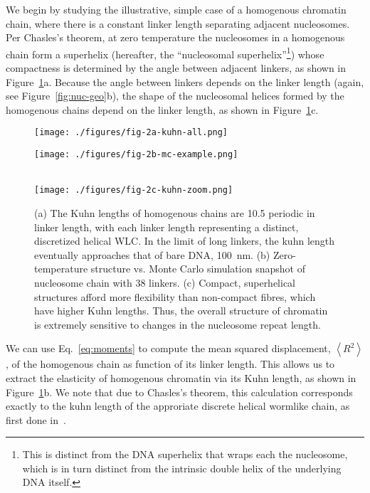 \documentclass[%
 reprint,
superscriptaddress,
showpacs,preprintnumbers,
 amsmath,amssymb,
 aps,
 prl,
]{revtex4-1}
\newcommand{\RR}{\left\langle{}R^2\right\rangle{}}
\begin{document}
We begin by studying the illustrative, simple case of a homogenous chromatin
    chain, where there is a constant linker length separating adjacent
    nucleosomes.
Per Chasles's theorem, at zero temperature the nucleosomes in a homogenous chain
    form a superhelix (hereafter, the ``nucleosomal superhelix''\footnote{%
        This is distinct from the DNA superhelix that wraps each the nucleosome,
        which is in turn distinct from the intrinsic double helix of the
        underlying DNA itself.})
    whose compactness is determined by the angle between adjacent linkers, as
    shown in Figure~\ref{fig:homo-kuhn}a.
Because the angle between linkers depends on the linker length (again, see
    Figure~\ref{fig:nuc-geo}b), the shape of the nucleosomal helices formed by
    the homogenous chains depend on the linker length, as shown in
    Figure~\ref{fig:homo-kuhn}c.
\begin{figure}[t]
    \centering
    \begin{minipage}{0.65\linewidth}
        \texttt{[image: ./figures/fig-2a-kuhn-all.png]}
    \end{minipage}
    \begin{minipage}{0.30\linewidth}
        \vfill
        \texttt{[image: ./figures/fig-2b-mc-example.png]}
        \vfill
    \end{minipage}
    \\
    \texttt{[image: ./figures/fig-2c-kuhn-zoom.png]}
    \caption{(a) The Kuhn lengths of homogenous chains are
    \SI{10.5}{\basepair} periodic
    in linker length, with each linker length representing a distinct,
    discretized helical
    WLC\@. In the limit of long linkers, the kuhn length eventually approaches that of bare DNA,
    \SI{100}{\nano\metre}. (b) Zero-temperature structure vs. Monte Carlo simulation
    snapshot of nucleosome chain with \SI{38}{\basepair} linkers. (c) Compact, superhelical structures afford more
    flexibility than non-compact fibres, which have higher Kuhn lengths. Thus,
    the overall structure of chromatin is extremely sensitive to changes in the
    nucleosome repeat length.}\label{fig:homo-kuhn}
\end{figure}



We can use Eq.~\ref{eq:moments} to compute the mean squared displacement, $\RR$,
    of the homogenous chain as function of its linker length.
This allows us to extract the elasticity of homogenous chromatin via its Kuhn
    length, as shown in Figure~\ref{fig:homo-kuhn}b.
We note that due to Chasles's theorem, this calculation corresponds exactly to
    the kuhn length of the approriate discrete helical wormlike chain, as first
    done in~\cite{yamakawa1976}.
\end{document}
